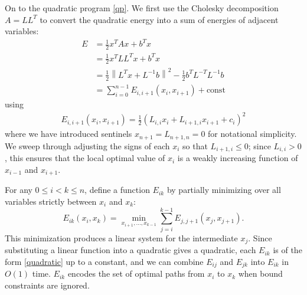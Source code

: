 \documentclass[11pt]{article}
\begin{document}
On to the quadratic program \cref{qp}.  We first use the Cholesky decomposition $A = L L^T$ to convert the quadratic energy into a sum of energies of adjacent variables:
\begin{align*}
E &= \frac{1}{2} x^T A x + b^T x  \\
  &= \frac{1}{2} x^T L L^T x + b^T x \\
  &= \frac{1}{2} \left\|L^T x + L^{-1}b \right\|^2 - \frac{1}{2} b^T L^{-T} L^{-1} b \\
  &= \sum_{i=0}^{n-1} E_{i,i+1}(x_i,x_{i+1}) + \textrm{const}
\end{align*}
using
\begin{align} \label{quadratic}
E_{i,i+1}(x_i,x_{i+1}) = \frac{1}{2} (L_{i,i} x_i + L_{i+1,i} x_{i+1} + c_i)^2
\end{align}
where we have introduced sentinels $x_{n+1} = L_{n+1,n} = 0$ for notational simplicity.  We sweep through adjusting the signs of each $x_i$ so that $L_{i+1,i} \le 0$; since $L_{i,i} > 0$, this
ensures that the local optimal value of $x_i$ is a weakly increasing function of $x_{i-1}$ and $x_{i+1}$.

For any $0 \le i < k \le n$, define a function $E_{ik}$ by partially minimizing over all variables strictly between $x_i$ and $x_k$:
$$E_{ik}(x_i,x_k) = \min_{x_{i+1}, \ldots, x_{k-1}} \sum_{j = i}^{k-1} E_{j,j+1}(x_j,x_{j+1}).$$
This minimization produces a linear system for the intermediate $x_j$.  Since substituting a linear function into a quadratic gives a quadratic, each $E_{ik}$ is of the form \cref{quadratic} up to a constant,
and we can combine $E_{ij}$ and $E_{jk}$ into $E_{ik}$ in $O(1)$ time.  $E_{ik}$ encodes the set of optimal paths from $x_i$ to $x_k$ when bound constraints are ignored.
\end{document}
